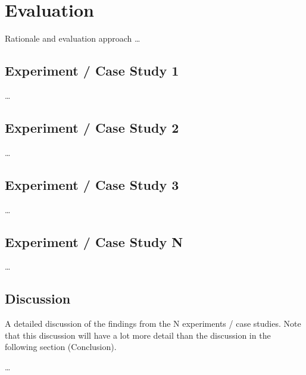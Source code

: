 
\section{Evaluation}
\label{sec:Evaluation}

Rationale and evaluation approach \dots


\subsection{Experiment / Case Study 1}
\label{sec:evalOne}

\dots


\subsection{Experiment / Case Study 2}
\label{sec:evalTwo}

\dots


\subsection{Experiment / Case Study 3}
\label{sec:evalThree}

\dots


\subsection{Experiment / Case Study N}
\label{sec:evalN}

\dots

\subsection{Discussion}
\label{sec:discussion}

A detailed discussion of the findings from the N experiments / case studies. Note that this discussion will have a lot more detail than the discussion in the following section (Conclusion).

\dots
